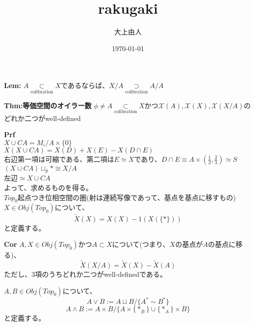 \documentclass[a4paper,11pt]{jsarticle}
\numberwithin{equation}{section}
\begin{document}
\title{rakugaki}
\author{大上由人}
\date{\today}
\maketitle

\begin{itembox}[l]{\textbf{Lem:}}
  $ A \underset{\text{cofibration}}{\subset} X$であるならば、$X/A \underset{\text{cofibration}}{\supset}A/A$
\end{itembox}

\begin{itembox}[l]{\textbf{Thm:等価空間のオイラー数}}
  $\phi \neq A \underset{\text{cofibration}}{\subset}X$かつ$\mathcal{X}(A), \mathcal{X}(X), \mathcal{X}(X/A)$のどれか二つがwell-defined

\end{itembox}
\textbf{Prf}\\
$X \cup CA =M_{\iota}/A\times \{0\}$\\
$X(X \cup CA) = X(D) + X(E) -X(D \cap E)$\\
右辺第一項は可縮である、第二項は$E\simeq X$であり、$D\cap E \equiv A \times (\frac{1}{3},\frac{2}{3}) \simeq S$\\
$(X \cup CA)\sqcup_{p} {*} \cong X/A$\\
左辺$\simeq X \cup CA$\\
よって、求めるものを得る。\\

$Top_0$起点つき位相空間の圏(射は連続写像であって、基点を基点に移すもの)\\
$ X \in Obj(Top_0)$について、
\begin{equation}
  \tilde{X}(X) = X(X) -1(X(\{*\}))
\end{equation}
と定義する。\\

\begin{itembox}[l]{\textbf{Cor}}
  $A,X \in Obj(Top_0)$かつ$A \subset X$について(つまり、$X$の基点が$A$の基点に移る)、
  \begin{equation}
    \tilde{X}(X/A) = \tilde{X}(X) - \tilde{X}(A)
  \end{equation}
  ただし、3項のうちどれか二つがwell-definedである。
\end{itembox}
$A,B \in Obj(Top_0)$について、
\begin{equation}
  A \vee B := A \sqcup B / \{A^* \sim B^*\}
\end{equation}
\begin{equation}
  A \wedge B := A \times B / \{A \times \{*_B\} \cup \{*_A\} \times B\}
\end{equation}
と定義する。\\
\end{document}
